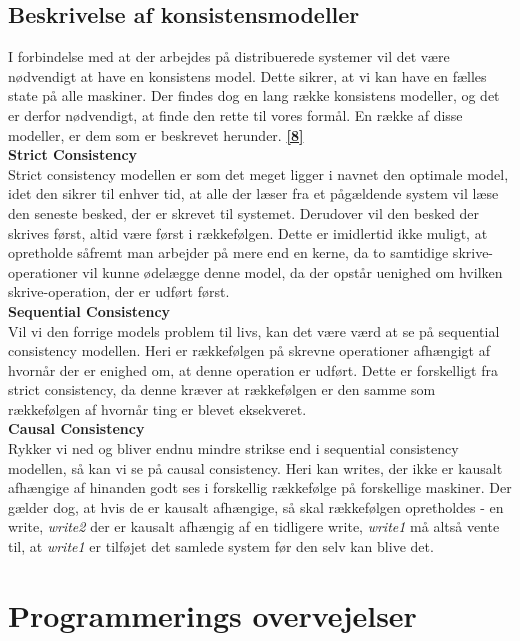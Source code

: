 \documentclass[a4paper,12pt]{article}
\begin{document}
\subsection{Beskrivelse af konsistensmodeller}
I forbindelse med at der arbejdes på distribuerede systemer vil det være nødvendigt at have en konsistens model. Dette sikrer, at vi kan have en fælles state på alle maskiner. 
Der findes dog en lang række konsistens modeller, og det er derfor nødvendigt, at finde den rette til vores formål. En række af disse modeller, er dem som er beskrevet herunder. \hyperref[otte]{\textbf{[8]}}
\\[5px]
\textbf{Strict Consistency}
\\
Strict consistency modellen er som det meget ligger i navnet den optimale model, idet den sikrer til enhver tid, at alle der læser fra et pågældende system vil læse den seneste besked, der er skrevet til systemet. Derudover vil den besked der skrives først, altid være først i rækkefølgen. Dette er imidlertid ikke muligt, at opretholde såfremt man arbejder på mere end en kerne, da to samtidige skrive-operationer vil kunne ødelægge denne model, da der opstår uenighed om hvilken skrive-operation, der er udført først.
\\[5px]
\textbf{Sequential Consistency}
\\
Vil vi den forrige models problem til livs, kan det være værd at se på sequential consistency modellen. Heri er rækkefølgen på skrevne operationer afhængigt af hvornår der er enighed om, at denne operation er udført. Dette er forskelligt fra strict consistency, da denne kræver at rækkefølgen er den samme som rækkefølgen af hvornår ting er blevet eksekveret.
\\[5px]
\textbf{Causal Consistency}
\\
Rykker vi ned og bliver endnu mindre strikse end i sequential consistency modellen, så kan vi se på causal consistency. Heri kan writes, der ikke er kausalt afhængige af hinanden godt ses i forskellig rækkefølge på forskellige maskiner. Der gælder dog, at hvis de er kausalt afhængige, så skal rækkefølgen opretholdes - en write, \textit{write2} der er kausalt afhængig af en tidligere write, \textit{write1} må altså vente til, at \textit{write1} er tilføjet det samlede system før den selv kan blive det.
\newpage

\section{Programmerings overvejelser}
\end{document}

